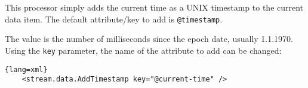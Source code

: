 
This processor simply adds the current time as a UNIX timestamp to the
current data item. The default attribute/key to add is
\texttt{@timestamp}.

The value is the number of milliseconds since the epoch date, usually
1.1.1970. Using the \texttt{key} parameter, the name of the attribute to
add can be changed:
\begin{lstlisting}{lang=xml}
    <stream.data.AddTimestamp key="@current-time" />
\end{lstlisting}


\begin{table}[h]
\end{table}
